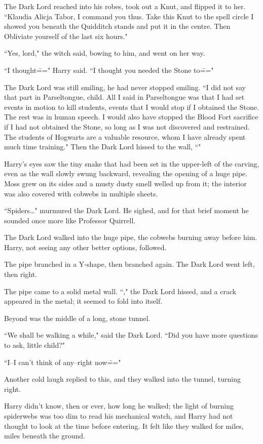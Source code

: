 The Dark Lord reached into his robes, took out a Knut, and flipped it to her. ``Klaudia Alicja Tabor, I command you thus. Take this Knut to the spell circle I showed you beneath the Quidditch stands and put it in the centre. Then Obliviate yourself of the last six hours."

``Yes, lord," the witch said, bowing to him, and went on her way.

``I thought\===" Harry said. ``I thought you needed the Stone to\==="

The Dark Lord was still smiling, he had never stopped smiling. ``I did not say that part in Parseltongue, child. All I said in Parseltongue was that I had set events in motion to kill students, events that I would stop if I obtained the Stone. The rest was in human speech. I would also have stopped the Blood Fort sacrifice if I had not obtained the Stone, so long as I was not discovered and restrained. The students of Hogwarts are a valuable resource, whom I have already spent much time training." Then the Dark Lord hissed to the wall, ``"

Harry's eyes saw the tiny snake that had been set in the upper-left of the carving, even as the wall slowly swung backward, revealing the opening of a huge pipe. Moss grew on its sides and a musty dusty smell welled up from it; the interior was also covered with cobwebs in multiple sheets.

``Spiders{\ldots}" murmured the Dark Lord. He sighed, and for that brief moment he sounded once more like Professor Quirrell.

The Dark Lord walked into the huge pipe, the cobwebs burning away before him. Harry, not seeing any other better options, followed.

The pipe branched in a Y-shape, then branched again. The Dark Lord went left, then right.

The pipe came to a solid metal wall. ``," the Dark Lord hissed, and a crack appeared in the metal; it seemed to fold into itself.

Beyond was the middle of a long, stone tunnel.

``We shall be walking a while," said the Dark Lord. ``Did you have more questions to ask, little child?"

``I\---I can't think of any\---right now\==="

Another cold laugh replied to this, and they walked into the tunnel, turning right.

Harry didn't know, then or ever, how long he walked; the light of burning spiderwebs was too dim to read his mechanical watch, and Harry had not thought to look at the time before entering. It felt like they walked for miles, miles beneath the ground.

